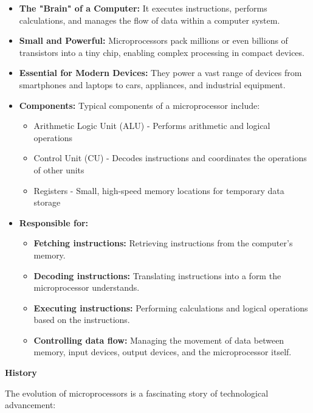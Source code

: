 \documentclass[
]{article}
\begin{document}
\begin{itemize}
\item
  \textbf{The "Brain" of a Computer:} It executes instructions, performs
  calculations, and manages the flow of data within a computer system.
\item
  \textbf{Small and Powerful:} Microprocessors pack millions or even
  billions of transistors into a tiny chip, enabling complex processing
  in compact devices.
\item
  \textbf{Essential for Modern Devices:} They power a vast range of
  devices from smartphones and laptops to cars, appliances, and
  industrial equipment.
\item
  \textbf{Components:} Typical components of a microprocessor include:

  \begin{itemize}
  \item
    Arithmetic Logic Unit (ALU) - Performs arithmetic and logical
    operations
  \item
    Control Unit (CU) - Decodes instructions and coordinates the
    operations of other units
  \item
    Registers - Small, high-speed memory locations for temporary data
    storage
  \end{itemize}
\item
  \textbf{Responsible for:}

  \begin{itemize}
  \item
    \textbf{Fetching instructions:} Retrieving instructions from the
    computer's memory.
  \item
    \textbf{Decoding instructions:} Translating instructions into a form
    the microprocessor understands.
  \item
    \textbf{Executing instructions:} Performing calculations and logical
    operations based on the instructions.
  \item
    \textbf{Controlling data flow:} Managing the movement of data
    between memory, input devices, output devices, and the
    microprocessor itself.
  \end{itemize}
\end{itemize}

\textbf{History}

The evolution of microprocessors is a fascinating story of technological
advancement:
\end{document}
